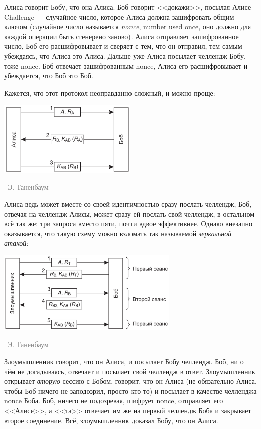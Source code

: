 \documentclass[a5paper]{article}
\newcommand{\attribution}[1] {
\vspace{-5mm}\begin{flushright}\begin{scriptsize}\textcolor{gray}{\textcopyright\, #1}\end{scriptsize}\end{flushright}
}
\begin{document}
Алиса говорит Бобу, что она Алиса. Боб говорит <<докажи>>, посылая Алисе Challenge --- случайное число, которое Алиса должна зашифровать общим ключом (случайное число называется \emph{nonce}, number used once, оно должно для каждой операции быть сгенерено заново). Алиса отправляет зашифрованное число, Боб его расшифровывает и сверяет с тем, что он отправил, тем самым убеждаясь, что Алиса это Алиса. Дальше уже Алиса посылает челлендж Бобу, тоже nonce. Боб отвечает зашифрованным nonce, Алиса его расшифровывает и убеждается, что Боб это Боб.

Кажется, что этот протокол неоправданно сложный, и можно проще:

\begin{center}
    \includegraphics[width=0.5\textwidth]{simpleChallengeResponse.png}
    \attribution{Э. Таненбаум}
\end{center}

Алиса ведь может вместе со своей идентичностью сразу послать челлендж, Боб, отвечая на челлендж Алисы, может сразу ей послать свой челлендж, в остальном всё так же: три запроса вместо пяти, почти вдвое эффективнее. Однако внезапно оказывается, что такую схему можно взломать так называемой \emph{зеркальной атакой}: 

\begin{center}
    \includegraphics[width=0.65\textwidth]{mirrorAttack.png}
    \attribution{Э. Таненбаум}
\end{center}

Злоумышленник говорит, что он Алиса, и посылает Бобу челлендж. Боб, ни о чём не догадываясь, отвечает и посылает свой челлендж в ответ. Злоумышленник открывает \emph{вторую} сессию с Бобом, говорит, что он Алиса (не обязательно Алиса, чтобы Боб ничего не заподозрил, просто кто-то) и посылает в качестве челленджа nonce Боба. Боб, ничего не подозревая, шифрует nonce, отправляет его <<Алисе>>, а <<та>> отвечает им же на первый челлендж Боба и закрывает второе соединение. Всё, злоумышленник доказал Бобу, что он Алиса.
\end{document}
